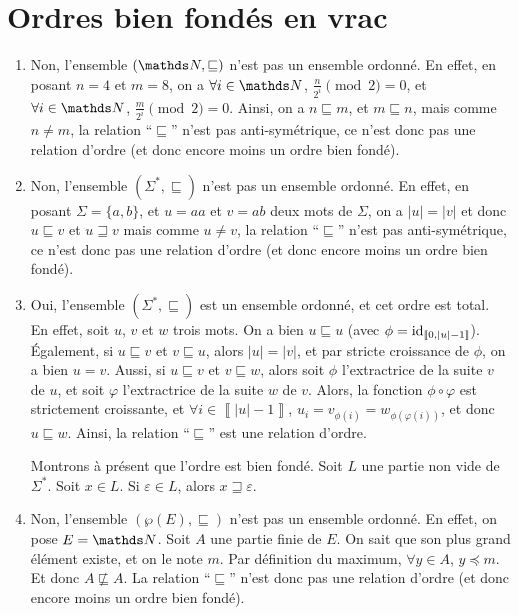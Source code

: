\section{Ordres bien fondés en vrac}

\begin{enumerate}
	\item Non, l'ensemble $(\N, \sqsubseteq)$\/ n'est pas un ensemble ordonné. En effet, en posant $n = 4$\/ et $m = 8$, on a $\forall i \in \N$, $\frac{n}{2^i}\pmod 2 = 0$, et $\forall i \in \N$, $\frac{m}{2^i} \pmod 2 = 0$. Ainsi, on a $n \sqsubseteq m$, et $m \sqsubseteq n$, mais comme $n \neq m$, la relation ``$\sqsubseteq$'' n'est pas anti-symétrique, ce n'est donc pas une relation d'ordre (et donc encore moins un ordre bien fondé).
	\item Non, l'ensemble $(\Sigma^*, \sqsubseteq)$\/ n'est pas un ensemble ordonné. En effet, en posant $\Sigma = \{a,b\}$, et $u = aa$\/ et $v = ab$\/ deux mots de $\Sigma$, on a $|u| = |v|$\/ et donc $u  \sqsubseteq v$\/ et $u \sqsupseteq v$ mais comme $u \neq v$, la relation ``$ \sqsubseteq$'' n'est pas anti-symétrique, ce n'est donc pas une relation d'ordre (et donc encore moins un ordre bien fondé).
	\item Oui, l'ensemble $(\Sigma^*, \sqsubseteq)$\/ est un ensemble ordonné, et cet ordre est total. En effet, soit $u$, $v$\/ et $w$ trois mots. On a bien $u \sqsubseteq u$\/ (avec $\phi = \operatorname{id}_{\left\llbracket 0,|u|-1 \right\rrbracket}$). Également, si $u \sqsubseteq v$\/ et $v\sqsubseteq u$, alors $|u| = |v|$, et par stricte croissance de $\phi$, on a bien $u = v$. Aussi, si $u \sqsubseteq v$\/ et $v \sqsubseteq w$, alors soit $\phi$\/ l'extractrice de la suite $v$\/ de $u$, et soit $\varphi$\/ l'extractrice de la suite $w$\/ de $v$. Alors, la fonction $\phi  \circ \varphi$\/ est strictement croissante, et $\forall i \in \left\llbracket |u|-1 \right\rrbracket$, $u_i = v_{\phi(i)} = w_{\phi(\varphi(i))}$, et donc $u \sqsubseteq w$. Ainsi, la relation ``$\sqsubseteq$'' est une relation d'ordre.

		Montrons à présent que l'ordre est bien fondé. Soit $L$\/ une partie non vide de $\Sigma^*$.
		Soit $x \in L$.
		Si $\varepsilon \in L$, alors $x \sqsupseteq \varepsilon$.

	\item Non, l'ensemble $(\wp(E), \sqsubseteq)$\/ n'est pas un ensemble ordonné. En effet, on pose $E = \N$. Soit $A$\/ une partie finie de $E$. On sait que son plus grand élément existe, et on le note $m$. Par définition du maximum, $\forall y \in A$, $y \preceq m$. Et donc $A \not\sqsubseteq A$. La relation ``$\sqsubseteq$'' n'est donc pas une relation d'ordre (et donc encore moins un ordre bien fondé).
\end{enumerate}

